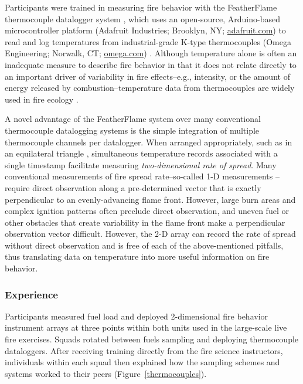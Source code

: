 \documentclass[fire,casereport,accept,moreauthors,pdftex]{Definitions/mdpi}  %
\begin{document}
Participants were trained in measuring fire behavior with the FeatherFlame thermocouple datalogger system \citep{mcgranahan2021b}, which uses an open-source, Arduino-based microcontroller platform (Adafruit Industries; Brooklyn, NY; \href{https://adafruit.com}{adafruit.com}) to read and log temperatures from industrial-grade K-type thermocouples (Omega Engineering; Norwalk, CT; \href{https://omega.com}{omega.com}) .%
Although temperature alone is often an inadequate measure to describe fire behavior in that it does not relate directly to an important driver of variability in fire effects--e.g., intensity, or the amount of energy released by combustion--temperature data from thermocouples are widely used in fire ecology \citep{mcgranahan2020}.

A novel advantage of the FeatherFlame system over many conventional thermocouple datalogging systems is the simple integration of multiple thermocouple channels per datalogger.
When arranged appropriately, such as in an equilateral triangle \citep{simard1984}, simultaneous temperature records associated with a single timestamp facilitate measuring \emph{two-dimensional rate of spread}.
Many conventional measurements of fire spread rate--so-called 1-D measurements \citep{finney2021}--require direct observation along a pre-determined vector that is exactly perpendicular to an evenly-advancing flame front.
However, large burn areas and complex ignition patterns often preclude direct observation, and uneven fuel or other obstacles that create variability in the flame front make a perpendicular observation vector difficult.
However, the 2-D array can record the rate of spread without direct observation and is free of each of the above-mentioned pitfalls, thus translating data on temperature into more useful information on fire behavior.

\subsubsection{Experience}

Participants measured fuel load and deployed 2-dimensional fire behavior instrument arrays at three points within both units used in the large-scale live fire exercises.
Squads rotated between fuels sampling and deploying thermocouple dataloggers.
After receiving training directly from the fire science instructors, individuals within each squad then explained how the sampling schemes and systems worked to their peers (Figure~\ref{thermocouples}).
\end{document}
